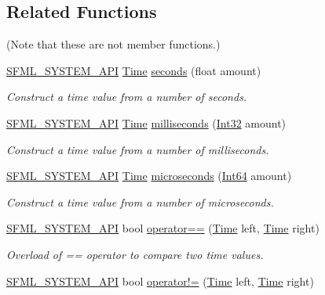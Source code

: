 \subsection*{Related Functions}
(Note that these are not member functions.) \begin{DoxyCompactItemize}
\item 
\hyperlink{_system_2_export_8hpp_a6476c9e422606477a4c23d92b1d79a1f}{S\-F\-M\-L\-\_\-\-S\-Y\-S\-T\-E\-M\-\_\-\-A\-P\-I} \hyperlink{classsf_1_1_time}{Time} \hyperlink{classsf_1_1_time_ae36b9ef700f0ed0516abf0194ceb546b}{seconds} (float amount)
\begin{DoxyCompactList}\small\item\em Construct a time value from a number of seconds. \end{DoxyCompactList}\item 
\hyperlink{_system_2_export_8hpp_a6476c9e422606477a4c23d92b1d79a1f}{S\-F\-M\-L\-\_\-\-S\-Y\-S\-T\-E\-M\-\_\-\-A\-P\-I} \hyperlink{classsf_1_1_time}{Time} \hyperlink{classsf_1_1_time_ae379d420bc07170668f51522023957b9}{milliseconds} (\hyperlink{namespacesf_ac2dfd4952377a26dee4750e2e4a30a15}{Int32} amount)
\begin{DoxyCompactList}\small\item\em Construct a time value from a number of milliseconds. \end{DoxyCompactList}\item 
\hyperlink{_system_2_export_8hpp_a6476c9e422606477a4c23d92b1d79a1f}{S\-F\-M\-L\-\_\-\-S\-Y\-S\-T\-E\-M\-\_\-\-A\-P\-I} \hyperlink{classsf_1_1_time}{Time} \hyperlink{classsf_1_1_time_a951fd7219641f1e8191887f5dfe0dc31}{microseconds} (\hyperlink{namespacesf_a2840579fed3494d9f330baf7a5a19903}{Int64} amount)
\begin{DoxyCompactList}\small\item\em Construct a time value from a number of microseconds. \end{DoxyCompactList}\item 
\hyperlink{_system_2_export_8hpp_a6476c9e422606477a4c23d92b1d79a1f}{S\-F\-M\-L\-\_\-\-S\-Y\-S\-T\-E\-M\-\_\-\-A\-P\-I} bool \hyperlink{classsf_1_1_time_a2b8453227f651e9d5db3663fa08c47e2}{operator==} (\hyperlink{classsf_1_1_time}{Time} left, \hyperlink{classsf_1_1_time}{Time} right)
\begin{DoxyCompactList}\small\item\em Overload of == operator to compare two time values. \end{DoxyCompactList}\item 
\hyperlink{_system_2_export_8hpp_a6476c9e422606477a4c23d92b1d79a1f}{S\-F\-M\-L\-\_\-\-S\-Y\-S\-T\-E\-M\-\_\-\-A\-P\-I} bool \hyperlink{classsf_1_1_time_ae06b561f6422ec8ca414d400efd2cf4b}{operator!=} (\hyperlink{classsf_1_1_time}{Time} left, \hyperlink{classsf_1_1_time}{Time} right)

\end{DoxyCompactItemize}
